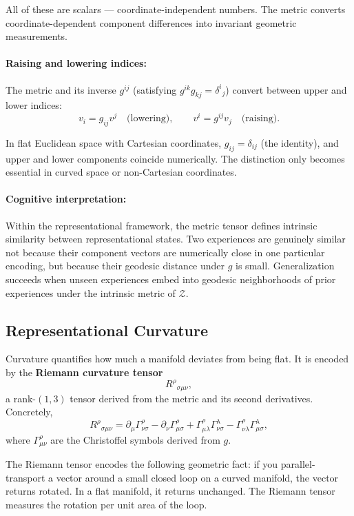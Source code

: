 \documentclass[12pt,a4paper]{article}
\begin{document}
All of these are scalars --- coordinate-independent numbers. The metric converts coordinate-dependent component differences into invariant geometric measurements.

\paragraph{Raising and lowering indices:} The metric and its inverse $g^{ij}$ (satisfying $g^{ik} g_{kj} = \delta^i{}_j$) convert between upper and lower indices:
\[
v_i = g_{ij} v^j \quad \text{(lowering)}, \qquad v^i = g^{ij} v_j \quad \text{(raising)}.
\]

In flat Euclidean space with Cartesian coordinates, $g_{ij} = \delta_{ij}$ (the identity), and upper and lower components coincide numerically. The distinction only becomes essential in curved space or non-Cartesian coordinates.

\paragraph{Cognitive interpretation:} Within the representational framework, the metric tensor defines intrinsic similarity between representational states. Two experiences are genuinely similar not because their component vectors are numerically close in one particular encoding, but because their geodesic distance under $g$ is small. Generalization succeeds when unseen experiences embed into geodesic neighborhoods of prior experiences under the intrinsic metric of $\mathcal{Z}$.

\subsection{Representational Curvature}

Curvature quantifies how much a manifold deviates from being flat. It is encoded by the \textbf{Riemann curvature tensor}
\[
R^\rho{}_{\sigma\mu\nu},
\]
a rank-$(1, 3)$ tensor derived from the metric and its second derivatives. Concretely,
\[
R^\rho{}_{\sigma\mu\nu} = \partial_\mu \Gamma^\rho_{\nu\sigma} - \partial_\nu \Gamma^\rho_{\mu\sigma} + \Gamma^\rho_{\mu\lambda} \Gamma^\lambda_{\nu\sigma} - \Gamma^\rho_{\nu\lambda} \Gamma^\lambda_{\mu\sigma},
\]
where $\Gamma^\rho_{\mu\nu}$ are the Christoffel symbols derived from $g$.

The Riemann tensor encodes the following geometric fact: if you parallel-transport a vector around a small closed loop on a curved manifold, the vector returns rotated. In a flat manifold, it returns unchanged. The Riemann tensor measures the rotation per unit area of the loop.
\end{document}

